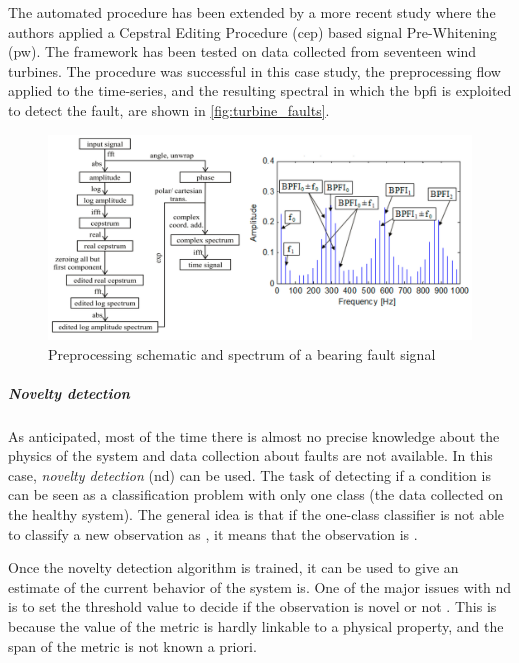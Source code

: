 The automated procedure \cite{sawalhi2008semi} has been extended by a more recent study \cite{schlechtingen2019automated} where the authors applied a Cepstral Editing Procedure (\gls{cep}) based signal Pre-Whitening (\gls{pw}). The framework has been tested on data collected from seventeen wind turbines. The procedure was successful in this case study, the preprocessing flow applied to the time-series, and the resulting spectral in which the \gls{bpfi} is exploited to detect the fault, are shown in \autoref{fig:turbine_faults}.

\begin{figure}
    \centering
    \includegraphics[width=\textwidth]{images/StateArt/spectrum.png}
    \caption{Preprocessing schematic and spectrum of a bearing fault signal \cite{schlechtingen2019automated}}
    \label{fig:turbine_faults}
\end{figure}

\subparagraph*{Novelty detection}
As anticipated, most of the time there is almost no precise knowledge about the physics of the system and data collection about faults are not available. In this case, \emph{novelty detection} (\gls{nd}) can be used. The task of detecting if a condition is  can be seen as a classification problem with only one class (the data collected on the healthy system). The general idea is that if the one-class classifier is not able to classify a new observation as , it means that the observation is .

Once the novelty detection algorithm is trained, it can be used to give an estimate of  the current behavior of the system is. One of the major issues with \gls{nd} is to set the threshold value to decide if the observation is novel or not \cite{NoveltyReview}. This is because the value of the metric is hardly linkable to a physical property, and the span of the metric is not known a priori.

